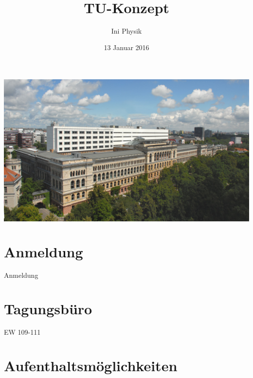 \documentclass[compress,]{beamer}
\title[TU-Konzept]{TU-Konzept}
\author{Ini Physik}
\institute[TU Berlin]
\begin{document}
\subject{Konzept an der TU}
\date{13 Januar 2016}

\begin{frame}
\begin{center}
\includegraphics[scale=0.3]{images/HvomPhysikgeb10-7-07-2_ohneKran_03.jpg}
\end{center}
\titlepage
\vspace{-2.5cm}
\end{frame}


\frame{\tableofcontents}

\section{Anmeldung}
\begin{frame}{Anmeldung}
\end{frame}


\section{Tagungsbüro}
\begin{frame}{EW 109-111}
\end{frame}


\section{Aufenthaltsmöglichkeiten}
\begin{frame}
\end{frame}
\end{document}
